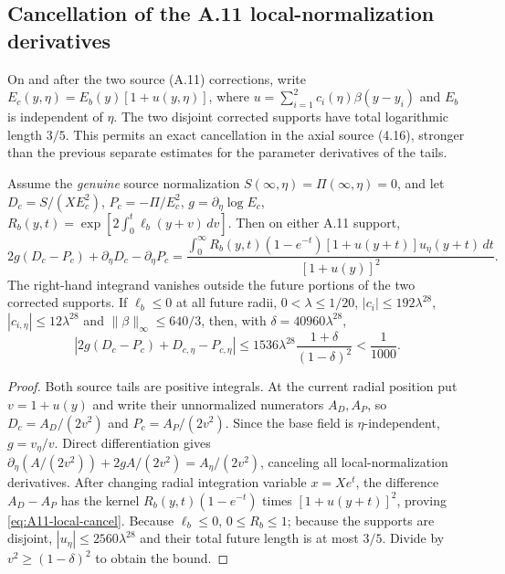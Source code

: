 \subsection*{Cancellation of the A.11 local-normalization derivatives}
\label{subsec:A11-local-derivative-cancellation}
On and after the two source (A.11) corrections, write
$E_c(y,\eta)=E_b(y)[1+u(y,\eta)]$, where
$u=\sum_{i=1}^2c_i(\eta)\beta(y-y_i)$ and
$E_b$ is independent of $\eta$. The two disjoint corrected supports
have total logarithmic length $3/5$. This permits an exact
cancellation in the axial source (4.16), stronger than the previous
separate estimates for the parameter derivatives of the tails.

\begin{theorem}\label{thm:A11-local-cancel}
Assume the \emph{genuine} source normalization
$S(\infty,\eta)=\Pi(\infty,\eta)=0$, and let
$D_c=S/(XE_c^2)$, $P_c=-\Pi/E_c^2$,
$g=\partial_\eta\log E_c$,
$R_b(y,t)=\exp[2\int_0^t\ell_b(y+v)\,dv]$.
Then on either A.11 support,
\begin{equation}\label{eq:A11-local-cancel}
2g(D_c-P_c)+\partial_\eta D_c-\partial_\eta P_c
=\frac{\int_0^\infty R_b(y,t)(1-e^{-t})
 [1+u(y+t)]u_\eta(y+t)\,dt}{[1+u(y)]^2}.
\end{equation}
The right-hand integrand vanishes outside the future portions
of the two corrected supports. If $\ell_b\le0$ at all future
radii, $0<\lambda\le1/20$,
$|c_i|\le192\lambda^{28}$,
$|c_{i,\eta}|\le12\lambda^{28}$ and
$\|\beta\|_\infty\le640/3$, then, with
$\delta=40960\lambda^{28}$,
\begin{equation}\label{eq:A11-local-cancel-bound}
|2g(D_c-P_c)+D_{c,\eta}-P_{c,\eta}|
\le1536\lambda^{28}\frac{1+\delta}{(1-\delta)^2}
<\frac1{1000}.
\end{equation}
\end{theorem}
\begin{proof}
Both source tails are positive integrals. At the current radial
position put $v=1+u(y)$ and write their unnormalized numerators
$A_D,A_P$, so $D_c=A_D/(2v^2)$ and
$P_c=A_P/(2v^2)$. Since the base field is $\eta$-independent,
$g=v_\eta/v$. Direct differentiation gives
$\partial_\eta(A/(2v^2))+2g A/(2v^2)=
A_\eta/(2v^2)$, canceling all local-normalization derivatives.
After changing radial integration variable $x=Xe^t$, the
difference $A_D-A_P$ has the kernel $R_b(y,t)(1-e^{-t})$
times $[1+u(y+t)]^2$, proving \eqref{eq:A11-local-cancel}.
Because $\ell_b\le0$, $0\le R_b\le1$; because the supports
are disjoint, $|u_\eta|\le2560\lambda^{28}$ and
their total future length is at most $3/5$. Divide by
$v^2\ge(1-\delta)^2$ to obtain the bound.
\end{proof}

